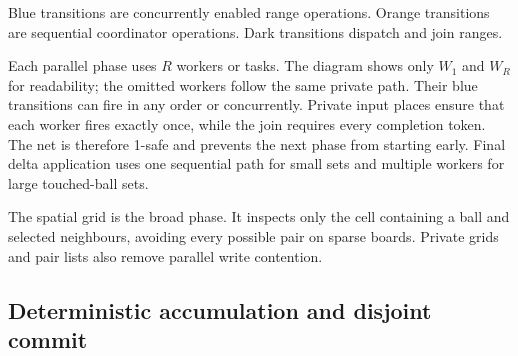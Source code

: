 \begin{center}

\small \textcolor{blue!55!black}{Blue transitions} are concurrently enabled
range operations. \textcolor{orange!75!black}{Orange transitions} are
sequential coordinator operations. Dark transitions dispatch and join ranges.
\end{center}

Each parallel phase uses $R$ workers or tasks. The diagram shows only $W_1$ and
$W_R$ for readability; the omitted workers follow the same private path. Their
blue transitions can fire in any order or concurrently. Private input places
ensure that each worker fires exactly once, while the join requires every
completion token. The net is therefore 1-safe and prevents the next phase from
starting early. Final delta application uses one sequential path for small sets
and multiple workers for large touched-ball sets.

The spatial grid is the broad phase. It inspects only the cell containing a
ball and selected neighbours, avoiding every possible pair on sparse boards.
Private grids and pair lists also remove parallel write contention.

\subsection{Deterministic accumulation and disjoint commit}

